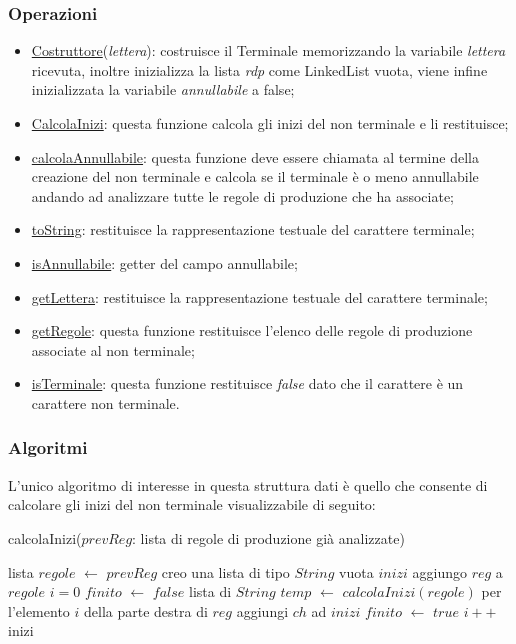 \documentclass[12pt]{article}
\newcounter{subsubsubsection}[subsubsection]
\begin{document}
\subsubsection{Operazioni}
\begin{itemize}
\item\underline{Costruttore}(\textit{lettera}): costruisce il Terminale memorizzando la variabile \textit{lettera} ricevuta, inoltre inizializza la lista \textit{rdp} come LinkedList vuota, viene infine inizializzata la variabile \textit{annullabile} a false;
\item\underline{CalcolaInizi}: questa funzione calcola gli inizi del non terminale e li restituisce;
\item\underline{calcolaAnnullabile}: questa funzione deve essere chiamata al termine della creazione del non terminale e calcola se il terminale è o meno annullabile andando ad analizzare tutte le regole di produzione che ha associate;
\item\underline{toString}: restituisce la rappresentazione testuale del carattere terminale;
\item\underline{isAnnullabile}: getter del campo annullabile;
\item\underline{getLettera}: restituisce la rappresentazione testuale del carattere terminale;
\item\underline{getRegole}: questa funzione restituisce l'elenco delle regole di produzione associate al non terminale;
\item\underline{isTerminale}: questa funzione restituisce \textit{false} dato che il carattere è un carattere non terminale.
\end{itemize}
\subsubsection{Algoritmi}
L'unico algoritmo di interesse in questa struttura dati è quello che consente di calcolare gli inizi del non terminale visualizzabile di seguito:
\begin{algorithm}[H]
\caption{calcolaInizi($prevReg$: lista di regole di produzione già analizzate)}
\begin{algorithmic}[1]
\State lista $regole$ $\leftarrow$ $prevReg$
\State creo una lista 	di tipo $String$ vuota $inizi$
\State aggiungo $reg$ a $regole$
\State $i = 0$
\State $finito$ $\leftarrow$ $false$
\Do
\State lista di $String$ $temp$ $\leftarrow$ $calcolaInizi(regole)$ per l'elemento $i$ della parte destra di $reg$
\State aggiungi $ch$ ad $inizi$
\EndIf
\EndFor
\EndIf
{}
\State $finito$ $\leftarrow$ $true$
\EndIf
\State $i++$
\EndIf
\EndIf
\EndFor
\State\Return inizi
\end{algorithmic}
\end{algorithm}
\end{document}
